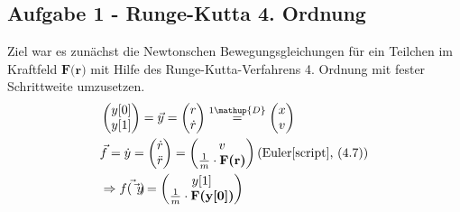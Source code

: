 \subsection*{Aufgabe 1 - Runge-Kutta 4. Ordnung}
Ziel war es zunächst die Newtonschen Bewegungsgleichungen für ein Teilchen im Kraftfeld $\textbf{F(r)}$ mit Hilfe des Runge-Kutta-Verfahrens 4. Ordnung mit fester Schrittweite umzusetzen.
\begin{equation}
	\begin{split}
 		&\begin{pmatrix}
			y[0] \\
			y[1] \\
		\end{pmatrix} =	
		\vec{y} = 
		\begin{pmatrix}
			r \\
			\dot{r} \\
		\end{pmatrix} \stackrel{1\mathup{D}}{=}
		\begin{pmatrix}
			x \\
			v \\
		\end{pmatrix} \\	
		& \vec{f} = \dot{y} =
		\begin{pmatrix}
			\dot{r} \\
			\ddot{r} \\
		\end{pmatrix} = 
		\begin{pmatrix}
			v \\
			\frac{1}{m} \cdot \textbf{F(r)} \\
		\end{pmatrix} \text{(Euler\cite[48]{script}, (4.7))} \\
		& \Rightarrow \vec{f(\vec{y})} = 
		\begin{pmatrix}
			y[1] \\
			\frac{1}{m} \cdot \textbf{F(y[0])} \\
		\end{pmatrix}
	\end{split}
	\label{rk4}
\end{equation}

